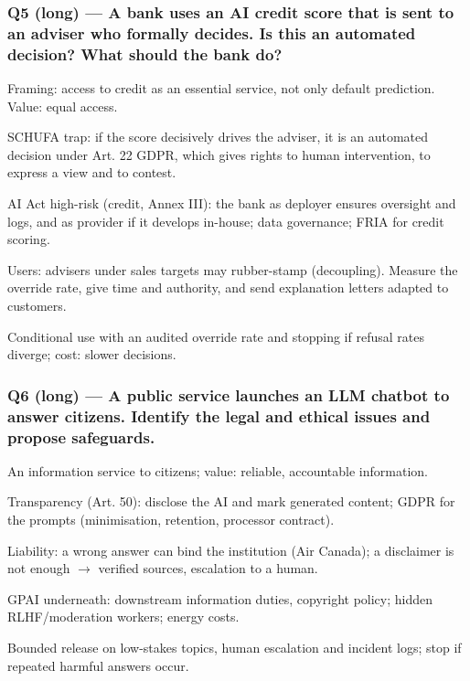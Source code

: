 \documentclass[11pt,a4paper]{article}
\newcommand{\blk}[1]{{\setlength{\fboxsep}{2pt}\colorbox{ink}{\sffamily\footnotesize\bfseries\color{white}\,#1\,}}}
\begin{document}
\subsubsection*{Q5 (long) — A bank uses an AI credit score that is sent to an adviser who formally decides. Is this an automated decision? What should the bank do?}
\begin{description}[leftmargin=1.2cm,style=sameline]
\item[\blk{F}] Framing: access to credit as an essential service, not only default prediction. Value: equal access.
\item[\blk{A1}] SCHUFA trap: if the score decisively drives the adviser, it is an automated decision under Art. 22 GDPR, which gives rights to human intervention, to express a view and to contest.
\item[\blk{A2}] AI Act high-risk (credit, Annex III): the bank as deployer ensures oversight and logs, and as provider if it develops in-house; data governance; FRIA for credit scoring.
\item[\blk{A3}] Users: advisers under sales targets may rubber-stamp (decoupling). Measure the override rate, give time and authority, and send explanation letters adapted to customers.
\item[\blk{R}] Conditional use with an audited override rate and stopping if refusal rates diverge; cost: slower decisions.
\end{description}
\subsubsection*{Q6 (long) — A public service launches an LLM chatbot to answer citizens. Identify the legal and ethical issues and propose safeguards.}
\begin{description}[leftmargin=1.2cm,style=sameline]
\item[\blk{F}] An information service to citizens; value: reliable, accountable information.
\item[\blk{A1}] Transparency (Art. 50): disclose the AI and mark generated content; GDPR for the prompts (minimisation, retention, processor contract).
\item[\blk{A2}] Liability: a wrong answer can bind the institution (Air Canada); a disclaimer is not enough $\rightarrow$ verified sources, escalation to a human.
\item[\blk{A3}] GPAI underneath: downstream information duties, copyright policy; hidden RLHF/moderation workers; energy costs.
\item[\blk{R}] Bounded release on low-stakes topics, human escalation and incident logs; stop if repeated harmful answers occur.
\end{description}
\end{document}
